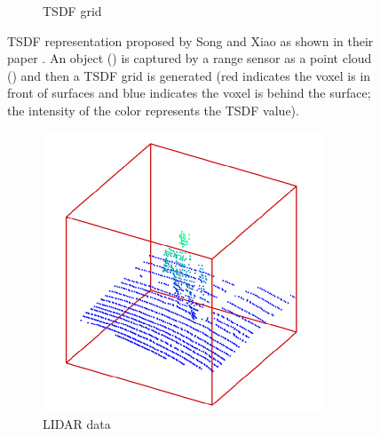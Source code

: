 \begin{figure}[!t]
\begin{subfigure}{0.3\textwidth}
		\caption{\ac{TSDF} grid}
		\label{subfig:objrecog:tsdf:grid}
	\end{subfigure}
	\hfill
	\caption{\ac{TSDF} representation proposed by Song and Xiao as shown in their paper \cite{Song2015}. An object () is captured by a range sensor as a point cloud () and then a \ac{TSDF} grid is generated (red indicates the voxel is in front of surfaces and blue indicates the voxel is behind the surface; the intensity of the color represents the \acs{TSDF} value).}
	\label{fig:objrecog:tsdf}
\end{figure}

\begin{figure}[!b]
	\centering
	\hfill
	\begin{subfigure}{0.23\textwidth}
		\centering
		\includegraphics[width=\linewidth]{Figures/ObjRecog/voxnet_1}
		\caption{\acs{LIDAR} data}
		\label{subfig:objrecog:voxnet:lidar}
	\end{subfigure}
	\hfill
	\begin{subfigure}{0.23\textwidth}
		\centering

\end{subfigure}
\end{figure}
